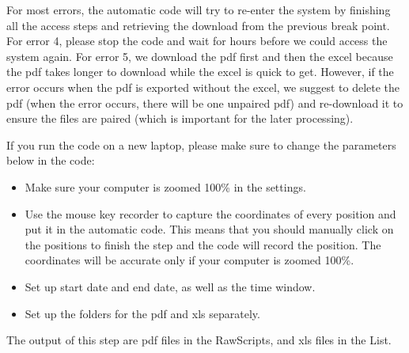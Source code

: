\documentclass[11pt]{article}
\newcounter{file}
\begin{document}
\par For most errors, the automatic code will try to re-enter the system by finishing all the access steps and retrieving the download from the previous break point. For error 4, please stop the code and wait for hours before we could access the system again. For error 5, we download the pdf first and then the excel because the pdf takes longer to download while the excel is quick to get. However, if the error occurs when the pdf is exported without the excel, we suggest to delete the pdf (when the error occurs, there will be one unpaired pdf) and re-download it to ensure the files are paired (which is important for the later processing).
\par If you run the code on a new laptop, please make sure to change the parameters below in the code:
\begin{itemize}
	\item Make sure your computer is zoomed 100\% in the settings.
	\item Use the mouse key recorder to capture the coordinates of every position and put it in the automatic code. This means that you should manually click on the positions to finish the step and the code will record the position. The coordinates will be accurate only if your computer is zoomed 100\%.
	\item Set up start date and end date, as well as the time window.
	\item Set up the folders for the pdf and xls separately.
\end{itemize}
\par The output of this step are pdf files in the RawScripts, and xls files in the List.
\end{document}
